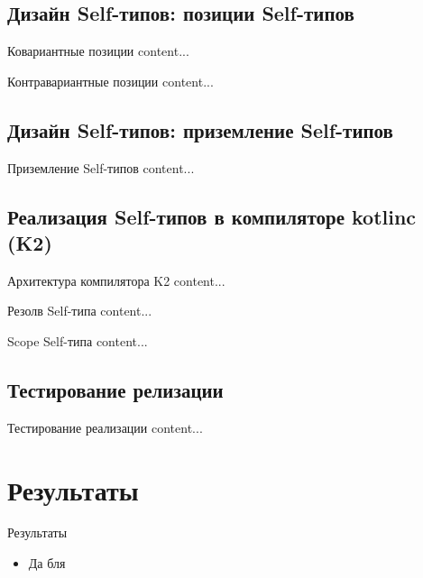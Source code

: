 \documentclass[handout,aspectratio=169,usenames,dvipsnames]{beamer}
\begin{document}
\subsection{Дизайн Self-типов: позиции Self-типов}

\begin{frame}{Ковариантные позиции}
content...
\end{frame}

\begin{frame}{Контравариантные позиции}
content...
\end{frame}

\subsection{Дизайн Self-типов: приземление Self-типов}

\begin{frame}{Приземление Self-типов}
content...
\end{frame}

\subsection{Реализация Self-типов в компиляторе kotlinc (K2)}

\begin{frame}{Архитектура компилятора K2}
content...
\end{frame}

\begin{frame}{Резолв Self-типа}
content...
\end{frame}

\begin{frame}{Scope Self-типа}
content...
\end{frame}

\subsection{Тестирование релизации}

\begin{frame}{Тестирование реализации}
content...
\end{frame}

\section{Результаты}

\begin{frame}{Результаты}
    \begin{itemize}
        \item Да бля
    \end{itemize}
\end{frame}
\end{document}
